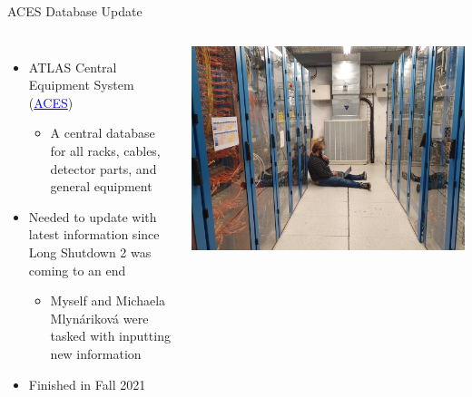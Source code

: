 \documentclass[aspectratio=169,xcolor=table]{beamer}
\begin{document}
    \begin{frame}[t]{ACES Database Update}
      \begin{columns}
          \begin{itemize}
          \item ATLAS Central Equipment System (\href{https://atlas-glance.cern.ch/atlas/aces/}{\textcolor{blue}{ACES}})
            \begin{itemize}
              \item A central database for all racks, cables, detector parts, and general equipment
            \end{itemize}
          \item Needed to update with latest information since Long Shutdown 2 was coming to an end
            \begin{itemize}
              \item Myself and Michaela Mlynáriková were tasked with inputting new information
            \end{itemize}
          \item Finished in Fall 2021
          \end{itemize}
          \centering
          \includegraphics[height=.39\textheight,keepaspectratio=true]{Hard_At_Work.jpg}


\end{columns}
\end{frame}
\end{document}
